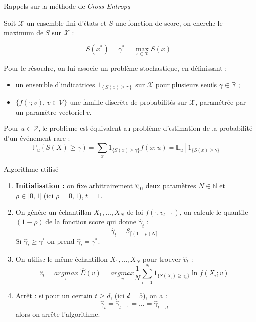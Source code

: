 \documentclass[10pt,xcolor=table,color={dvipsnames,usenames},ignorenonframetext,usepdftitle=false,french]{beamer}
\begin{document}
\begin{frame}{Rappels sur la méthode de \emph{Cross-Entropy}}
\protect\hypertarget{rappels-sur-la-muxe9thode-de-cross-entropy-1}{}

Soit \(\mathcal{X}\) un ensemble fini d'états et \(S\) une fonction de
score, on cherche le maximum de \(S\) sur \(\mathcal{X}\) :

\begin{equation} 
S(x^{*})=\gamma^{*}=\underset{x\in\mathcal{X}}{{\max}} S(x)
\end{equation}

Pour le résoudre, on lui associe un problème stochastique, en
définissant :

\begin{itemize}
\item un ensemble d'indicatrices $1_{\left\{ S(x)\geq\gamma\right\}}$ sur $\mathcal{X}$ pour plusieurs seuils $\gamma\in\mathbb{R}$ ;  
\item $\{f(\cdot;v),\,v\in\mathcal{V}\}$ une famille discrète de probabilités sur $\mathcal{X}$, paramétrée par un paramètre vectoriel $v$. 
\end{itemize}

Pour \(u\in\mathcal{V}\), le problème est équivalent au problème
d'estimation de la probabilité d'un événement rare :
\[\mathbb{P}_{u}(S(X)\geq\gamma)=\sum_{x}1_{\{S(x)\geq\gamma\}}f(x;u)=\mathbb{E}_{u}[1_{\{S(x)\geq\gamma\}}]\]

\end{frame}

\begin{frame}{Algorithme utilisé}
\protect\hypertarget{algorithme-utilisuxe9}{}

\begin{enumerate}

\item<1-> \textbf{Initialisation :} on fixe arbitrairement $\hat{v}_{0}$, deux paramètres $N\in \mathbb N$ et $\rho\in]0,1[$ (ici $\rho = 0,1$), $t = 1$.  
\item<2-> On génère un échantillon $X_{1},\dots,X_{N}$ de loi $f(\cdot,v_{t-1})$, on calcule le quantile $(1-\rho)$ de la fonction score qui donne $\hat{\gamma}_{t}$ :
$$\hat{\gamma}_{t}=S_{\lceil(1-\rho)N\rceil}$$
Si $\hat{\gamma}_{t}\geq\gamma^*$ on prend $\hat{\gamma}_{t}=\gamma^*$.  

\item<3-> On utilise le même échantillon $X_{1},\dots,X_{N}$ pour trouver $\hat{v}_{t}$ :
\begin{equation}
\hat{v}_{t}=\underset{v}{argmax}\;\hat{D}(v)=\underset{v}{argmax}\frac{1}{N}\sum_{i=1}^{N}1_{\{S(X_{i})\geq\hat{\gamma}_{t}\}}\ln f(X_{i};v)
\end{equation}
\item<4-> Arrêt : si pour un certain $t\geq d$, (ici $d=5$), on a : 
$$\hat{\gamma}_{t}=\hat{\gamma}_{t-1}=\dots=\hat{\gamma}_{t-d}$$
alors on arrête l'algorithme.
\end{enumerate}

\end{frame}
\end{document}
